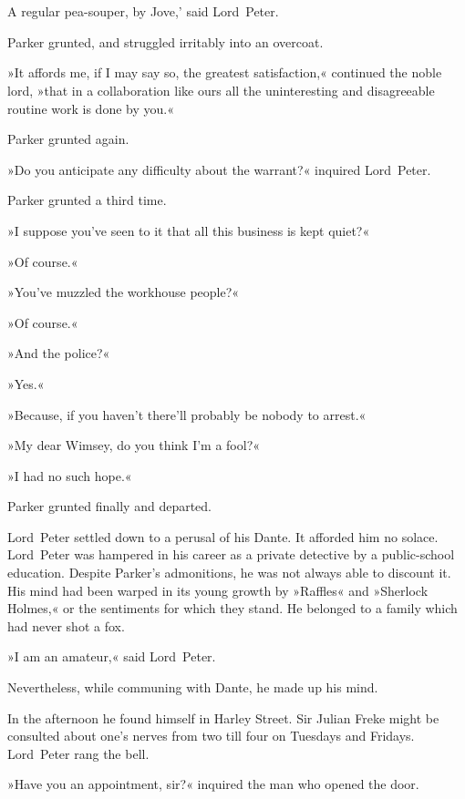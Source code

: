 \chapter[Chapter \thechapter]{}
\lettrine[lines=4,ante=‘]{A}{} regular pea-souper, by Jove,' said Lord~Peter.

\zz
Parker grunted, and struggled irritably into an overcoat.

\zz
»It affords me, if I may say so, the greatest satisfaction,« continued the noble lord, »that in a collaboration like ours all the uninteresting and disagreeable routine work is done by you.«

Parker grunted again.

»Do you anticipate any difficulty about the warrant?« inquired Lord~Peter.

Parker grunted a third time.

»I suppose you've seen to it that all this business is kept quiet?«

»Of course.«

»You've muzzled the workhouse people?«

»Of course.«

»And the police?«

»Yes.«

»Because, if you haven't there'll probably be nobody to arrest.«

»My dear Wimsey, do you think I'm a fool?«

»I had no such hope.«

Parker grunted finally and departed.

Lord~Peter settled down to a perusal of his Dante. It afforded him no solace. Lord~Peter was hampered in his career as a private detective by a public-school education. Despite Parker's admonitions, he was not always able to discount it. His mind had been warped in its young growth by »Raffles« and »Sherlock Holmes,« or the sentiments for which they stand. He belonged to a family which had never shot a fox.

»I am an amateur,« said Lord~Peter.

Nevertheless, while communing with Dante, he made up his mind.

In the afternoon he found himself in Harley Street. Sir Julian Freke might be consulted about one's nerves from two till four on Tuesdays and Fridays. Lord~Peter rang the bell.

»Have you an appointment, sir?« inquired the man who opened the door.

